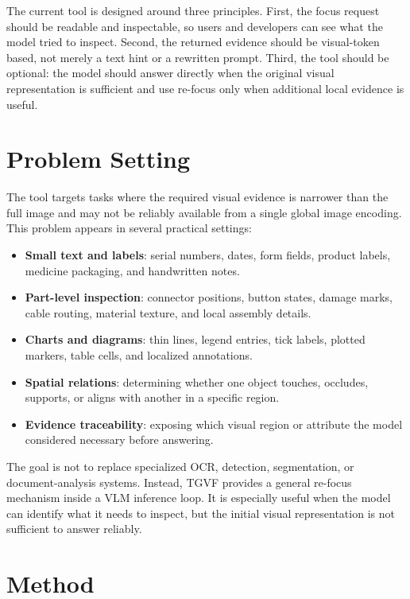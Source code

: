 \documentclass[10pt,twocolumn]{article}
\newcommand{\method}{TGVF}
\begin{document}
The current tool is designed around three principles. First, the focus request should be readable and inspectable, so users and developers can see what the model tried to inspect. Second, the returned evidence should be visual-token based, not merely a text hint or a rewritten prompt. Third, the tool should be optional: the model should answer directly when the original visual representation is sufficient and use re-focus only when additional local evidence is useful.

\section{Problem Setting}

The tool targets tasks where the required visual evidence is narrower than the full image and may not be reliably available from a single global image encoding. This problem appears in several practical settings:

\begin{itemize}
  \item \textbf{Small text and labels}: serial numbers, dates, form fields, product labels, medicine packaging, and handwritten notes.
  \item \textbf{Part-level inspection}: connector positions, button states, damage marks, cable routing, material texture, and local assembly details.
  \item \textbf{Charts and diagrams}: thin lines, legend entries, tick labels, plotted markers, table cells, and localized annotations.
  \item \textbf{Spatial relations}: determining whether one object touches, occludes, supports, or aligns with another in a specific region.
  \item \textbf{Evidence traceability}: exposing which visual region or attribute the model considered necessary before answering.
\end{itemize}

The goal is not to replace specialized OCR, detection, segmentation, or document-analysis systems. Instead, \method{} provides a general re-focus mechanism inside a VLM inference loop. It is especially useful when the model can identify what it needs to inspect, but the initial visual representation is not sufficient to answer reliably.

\section{Method}
\end{document}
